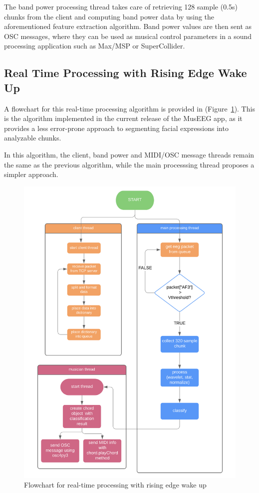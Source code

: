 The band power processing thread takes care of retrieving 128 sample (0.5s) chunks from the client and computing band power data by using the aforementioned feature extraction algorithm. Band power values are then sent as OSC messages, where they can be used as musical control parameters in a sound processing application such as Max/MSP or SuperCollider. 

\subsection{Real Time Processing with Rising Edge Wake Up}
A flowchart for this real-time processing algorithm is provided in (Figure~\ref{fig:processorwithwakeup}). This is the algorithm implemented in the current release of the MusEEG app, as it provides a less error-prone approach to segmenting facial expressions into analyzable chunks. 

In this algorithm, the client, band power and MIDI/OSC message threads remain the same as the previous algorithm, while the main processsing thread proposes a simpler approach. 
 
 \begin{figure}[htbp]
	\centering
		\includegraphics[width=0.75\columnwidth]{processorwithwakeup.png}
	\caption{Flowchart for real-time processing with rising edge wake up}
	\label{fig:processorwithwakeup}
\end{figure} 

